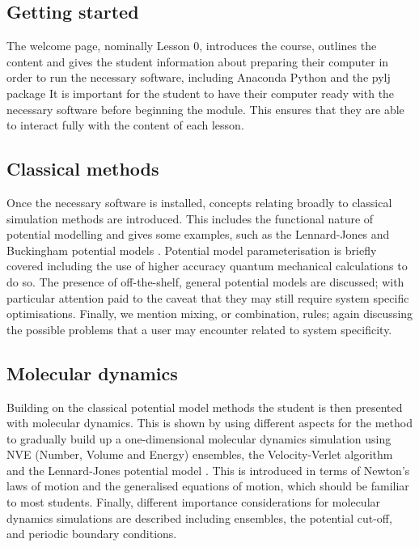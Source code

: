 \documentclass[amsmath,amssymb,twocolumn,superscriptaddress]{revtex4-1}
\begin{document}
\subsection{Getting started}

The welcome page, nominally Lesson 0, introduces the course, outlines the content and gives the student information about preparing their computer in order to run the necessary software, including Anaconda Python and the pylj package \cite{mccluskey_pylj_2018}
It is important for the student to have their computer ready with the necessary software before beginning the module.
This ensures that they are able to interact fully with the content of each lesson.

\subsection{Classical methods}

Once the necessary software is installed, concepts relating broadly to classical simulation methods are introduced.
This includes the functional nature of potential modelling and gives some examples, such as the Lennard-Jones and Buckingham potential models \cite{lennard-jones_determination_1924,buckingham_classical_1938}.
Potential model parameterisation is briefly covered including the use of higher accuracy quantum mechanical calculations to do so.
The presence of off-the-shelf, general potential models are discussed; with particular attention paid to the caveat that they may still require system specific optimisations.
Finally, we mention mixing, or combination, rules; again discussing the possible problems that a user may encounter related to system specificity.

\subsection{Molecular dynamics}

Building on the classical potential model methods the student is then presented with molecular dynamics.
This is shown by using different aspects for the method to gradually build up a one-dimensional molecular dynamics simulation using NVE (Number, Volume and Energy) ensembles, the Velocity-Verlet algorithm and the Lennard-Jones potential model \cite{swope_computer_1982,lennard-jones_determination_1924}.
This is introduced in terms of Newton's laws of motion and the generalised equations of motion, which should be familiar to most students.
Finally, different importance considerations for molecular dynamics simulations are described including ensembles, the potential cut-off, and periodic boundary conditions.
\end{document}
